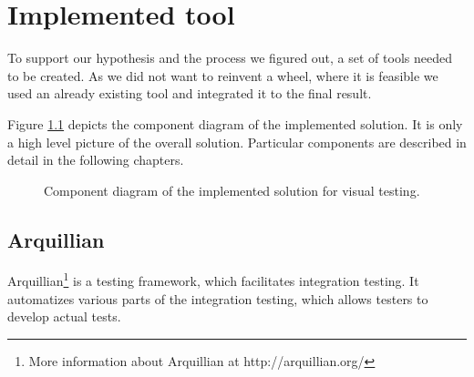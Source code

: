 \documentclass[11pt,oneside,final]{fithesis2}
\begin{document}
  
\chapter{Implemented tool}
To support our hypothesis and the process we figured out, a set of tools needed to be created. As we did
not want to reinvent a wheel, where it is feasible we used an already existing tool and integrated it to the
final result.

Figure \ref{fig:componentDiagramOfImpl} depicts the component diagram of the implemented solution. It is only a high
level picture of the overall solution. Particular components are described in detail in the following chapters.

\begin{figure}[!htb]
    \begin{center}
    \leavevmode
    \centerline{}
    \end{center}
    \caption{Component diagram of the implemented solution for visual testing.}
    \label{fig:componentDiagramOfImpl}
\end{figure}
  
\section{Arquillian}
Arquillian\footnote{More information about Arquillian at http://arquillian.org/} is a testing framework, which facilitates integration testing. It automatizes various parts
of the integration testing, which allows testers to develop actual tests.
\end{document}

